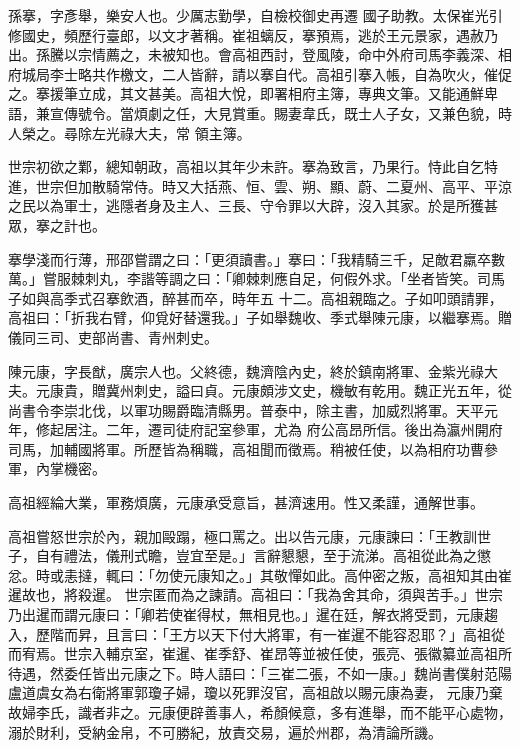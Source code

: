 
\begin{pinyinscope}

 孫搴，字彥舉，樂安人也。少厲志勤學，自檢校御史再遷
 國子助教。太保崔光引修國史，頻歷行臺郎，以文才著稱。崔祖螭反，搴預焉，逃於王元景家，遇赦乃出。孫騰以宗情薦之，未被知也。會高祖西討，登風陵，命中外府司馬李義深、相府城局李士略共作檄文，二人皆辭，請以搴自代。高祖引搴入帳，自為吹火，催促之。搴援筆立成，其文甚美。高祖大悅，即署相府主簿，專典文筆。又能通鮮卑語，兼宣傳號令。當煩劇之任，大見賞重。賜妻韋氏，既士人子女，又兼色貌，時人榮之。尋除左光祿大夫，常
 領主簿。



 世宗初欲之鄴，總知朝政，高祖以其年少未許。搴為致言，乃果行。恃此自乞特進，世宗但加散騎常侍。時又大括燕、恒、雲、朔、顯、蔚、二夏州、高平、平涼之民以為軍士，逃隱者身及主人、三長、守令罪以大辟，沒入其家。於是所獲甚眾，搴之計也。



 搴學淺而行薄，邢邵嘗謂之曰：「更須讀書。」搴曰：「我精騎三千，足敵君羸卒數萬。」嘗服棘刺丸，李諧等調之曰：「卿棘刺應自足，何假外求。「坐者皆笑。司馬子如與高季式召搴飲酒，醉甚而卒，時年五
 十二。高祖親臨之。子如叩頭請罪，高祖曰：「折我右臂，仰覓好替還我。」子如舉魏收、季式舉陳元康，以繼搴焉。贈儀同三司、吏部尚書、青州刺史。



 陳元康，字長猷，廣宗人也。父終德，魏濟陰內史，終於鎮南將軍、金紫光祿大夫。元康貴，贈冀州刺史，謚曰貞。元康頗涉文史，機敏有乾用。魏正光五年，從尚書令李崇北伐，以軍功賜爵臨清縣男。普泰中，除主書，加威烈將軍。天平元年，修起居注。二年，遷司徒府記室參軍，尤為
 府公高昂所信。後出為瀛州開府司馬，加輔國將軍。所歷皆為稱職，高祖聞而徵焉。稍被任使，以為相府功曹參軍，內掌機密。



 高祖經綸大業，軍務煩廣，元康承受意旨，甚濟速用。性又柔謹，通解世事。



 高祖嘗怒世宗於內，親加毆蹋，極口罵之。出以告元康，元康諫曰：「王教訓世子，自有禮法，儀刑式瞻，豈宜至是。」言辭懇懇，至于流涕。高祖從此為之懲忿。時或恚撻，輒曰：「勿使元康知之。」其敬憚如此。高仲密之叛，高祖知其由崔暹故也，將殺暹。
 世宗匿而為之諫請。高祖曰：「我為舍其命，須與苦手。」世宗乃出暹而謂元康曰：「卿若使崔得杖，無相見也。」暹在廷，解衣將受罰，元康趨入，歷階而昇，且言曰：「王方以天下付大將軍，有一崔暹不能容忍耶？」高祖從而宥焉。世宗入輔京室，崔暹、崔季舒、崔昂等並被任使，張亮、張徽纂並高祖所待遇，然委任皆出元康之下。時人語曰：「三崔二張，不如一康。」魏尚書僕射范陽盧道虞女為右衛將軍郭瓊子婦，瓊以死罪沒官，高祖啟以賜元康為妻，
 元康乃棄故婦李氏，識者非之。元康便辟善事人，希顏候意，多有進舉，而不能平心處物，溺於財利，受納金帛，不可勝紀，放責交易，遍於州郡，為清論所譏。




\end{pinyinscope}
